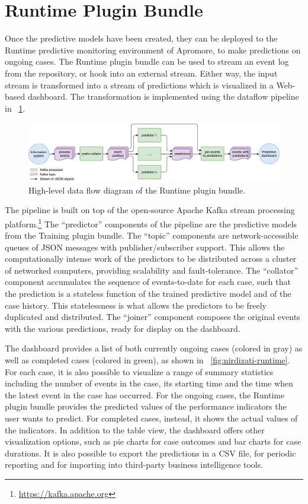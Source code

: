 \documentclass[runningheads,a4paper]{llncs}
\begin{document}
\section{Runtime Plugin Bundle} \label{sec:runtime}
Once the predictive models have been created, they can be deployed to the Runtime predictive monitoring environment of Apromore, to make predictions on ongoing cases. The Runtime plugin bundle can be used to stream an event log from the repository, or hook into an external stream. Either way, the input stream is transformed into a stream of predictions which is visualized in a Web-based dashboard. The transformation is implemented using the dataflow pipeline in \figurename~\ref{fig:dfd_0}.
\vspace{-.5\baselineskip}
\begin{figure}[htp!]
	\centering
	\includegraphics[width=\textwidth]{img/runtime-dataflow}
	\caption{High-level data flow diagram of the Runtime plugin bundle.}
	\label{fig:dfd_0}
\end{figure}
\vspace{-.5\baselineskip}

The pipeline is built on top of the open-source Apache Kafka stream processing platform.\footnote{\url{https://kafka.apache.org}} The ``predictor'' components of the pipeline are the predictive models from the Training plugin bundle. The ``topic'' components are network-accessible queues of JSON messages with publisher/subscriber support. This allows the computationally intense work of the predictors to be distributed across a cluster of networked computers, providing scalability and fault-tolerance.
The ``collator'' component accumulates the sequence of events-to-date for each case, such that the prediction is a stateless function of the trained predictive model and of the case history.  This statelessness is what allows the predictors to be freely duplicated and distributed.  The ``joiner'' component composes the original events with the various predictions, ready for display on the dashboard.

The dashboard provides a list of both currently ongoing cases (colored in gray) as well as completed cases (colored in green), as shown in \figurename~\ref{fig:nirdizati-runtime}. For each case, it is also possible to visualize a range of summary statistics including the number of events in the case, its starting time and the time when the latest event in the case has occurred. For the ongoing cases, the Runtime plugin bundle provides the predicted values of the performance indicators the user wants to predict. For completed cases, instead, it shows the actual values of the indicators. In addition to the table view, the dashboard offers other visualization options, such as pie charts for case outcomes and bar charts for case durations. It is also possible to export the predictions in a CSV file, for periodic reporting and for importing into third-party business intelligence tools.
\end{document}
